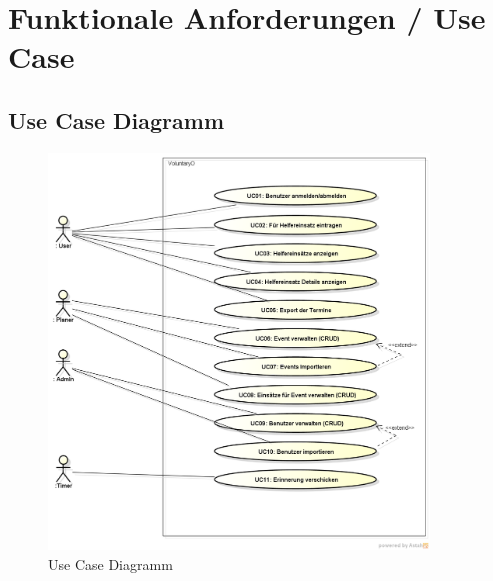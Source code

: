 \chapter{Funktionale Anforderungen / Use Case}

	\section{Use Case Diagramm}    
    \begin{figure}[h]
    	\centering
    	\includegraphics[width=0.9\textwidth]{content/anforderungsspezifikation/images/usecase_diagram.png}
    	\caption{Use Case Diagramm}
	\end{figure}
	
